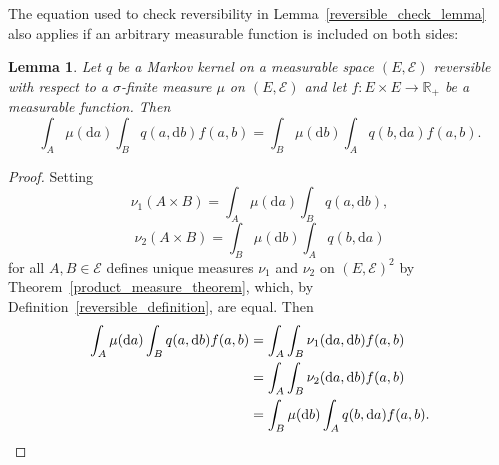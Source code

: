\documentclass[english,twoside,openright]{HYgraduMLDS}
\newtheorem{lemma}{Lemma}[chapter]
\newcommand{\R}{\mathbb{R}}
\newcommand{\dx}{\mathrm{d}}
\begin{document}
The equation used to check reversibility in Lemma~\ref{reversible_check_lemma}
also applies if an arbitrary measurable function is included on both sides:
\begin{lemma}\label{reversible_integration_lemma}
  Let \(q\) be a Markov kernel on a measurable space \((E, \mathcal{E})\)
  reversible with respect to a \(\sigma\)-finite measure \(\mu\) on
  \((E, \mathcal{E})\) and let \(f\colon E\times E\to \R_{+}\) be a
  measurable function. Then
  \[
    \int_{A}\mu(\dx a)\int_{B}q(a, \dx b)f(a, b)
    = \int_{B}\mu(\dx b)\int_{A}q(b, \dx a)f(a, b).
  \]
\end{lemma}
\begin{proof}
  Setting
  \[
    \nu_{1}(A\times B) = \int_{A}\mu(\dx a)\int_{B}q(a, \dx b),
  \]
  \[
    \nu_{2}(A\times B) = \int_{B}\mu(\dx b)\int_{A}q(b, \dx a)
  \]
  for all \(A, B\in \mathcal{E}\) defines unique measures
  \(\nu_{1}\) and \(\nu_{2}\) on
  \((E, \mathcal{E})^{2}\) by Theorem~\ref{product_measure_theorem}, which,
  by Definition~\ref{reversible_definition}, are equal. Then
  \begin{align*}
    \int_{A}\mu(\dx a)\int_{B}q(a, \dx b)f(a, b)
    &= \int_{A}\int_{B}\nu_{1}(\dx a, \dx b)f(a, b)
    \\&= \int_{A}\int_{B}\nu_{2}(\dx a, \dx b)f(a, b)
    \\&= \int_{B}\mu(\dx b)\int_{A}q(b, \dx a)f(a, b).
    \qedhere
  \end{align*}
\end{proof}
\end{document}
